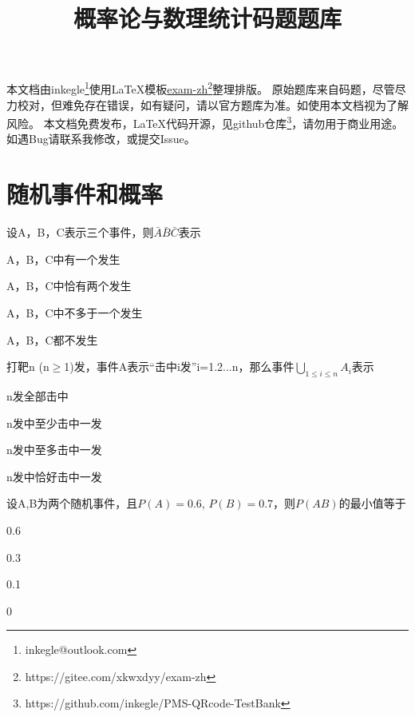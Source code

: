 \documentclass{exam-zh}
\title{概率论与数理统计码题题库}
\begin{document}
\maketitle

本文档由inkegle\footnote{inkegle@outlook.com}使用\LaTeX{}模板\href{https://gitee.com/xkwxdyy/exam-zh}{exam-zh}\footnote{https://gitee.com/xkwxdyy/exam-zh}整理排版。
原始题库来自码题，尽管尽力校对，但难免存在错误，如有疑问，请以官方题库为准。如使用本文档视为了解风险。
本文档免费发布，\LaTeX{}代码开源，见github仓库\footnote{https://github.com/inkegle/PMS-QRcode-TestBank}，请勿用于商业用途。
如遇Bug请联系我修改，或提交Issue。


\section{随机事件和概率}

\begin{question}
  设A，B，C表示三个事件，则$\bar{A}\bar{B}\bar{C}$表示 \paren[D]
  \begin{choices}
    \item A，B，C中有一个发生
    \item A，B，C中恰有两个发生
    \item A，B，C中不多于一个发生
    \item A，B，C都不发生
  \end{choices}
\end{question}

\begin{question}
  打靶n (n$\geqslant $1)发，事件A表示“击中i发”i=1.2...n，那么事件$\bigcup_{1\leqslant i\le n}{A_i}$表示 \paren[B]
  \begin{choices}
    \item n发全部击中
    \item n发中至少击中一发
    \item n发中至多击中一发
    \item n发中恰好击中一发
  \end{choices}
\end{question}

\begin{question}
  设A,B为两个随机事件，且$P(A)=0.6$, $P(B)=0.7$，则$P(AB)$的最小值等于 \paren[B]
  \begin{choices}
    \item 0.6
    \item 0.3
    \item 0.1
    \item 0
  \end{choices}
\end{question}
\end{document}

